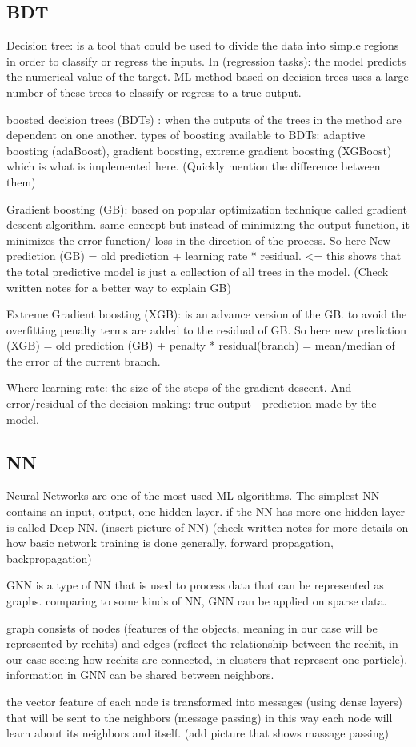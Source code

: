 \subsection{BDT}

Decision tree: is a tool that could be used to divide the data into simple regions in order to classify or regress the inputs. In (regression tasks): the model predicts the numerical value of the target. ML method based on decision trees uses a large number of these trees to classify or regress to a true output.

boosted decision trees (BDTs) : when the outputs of the trees in the method are dependent on one another.  types of boosting available to BDTs: adaptive boosting (adaBoost), gradient boosting, extreme gradient boosting (XGBoost) which is what is implemented here. (Quickly mention the difference between them)

Gradient boosting (GB): based on popular optimization technique called gradient descent algorithm. same concept but instead of minimizing the output function, it minimizes the error function/ loss in the direction of the process. So here New prediction (GB) = old prediction + learning rate * residual. <= this shows that the total predictive model is just a collection of all trees in the model. (Check written notes for a better way to explain GB)

Extreme Gradient boosting (XGB): is an advance version of the GB. to avoid the overfitting penalty terms are added to the residual of GB. So here new prediction (XGB) = old prediction (GB) + penalty * residual(branch) = mean/median of the error of the current branch.

Where learning rate: the size of the steps of the gradient descent. And error/residual of the decision making: true output - prediction made by the model. 


\subsection{NN} 

Neural Networks are one of the most used ML algorithms. The simplest NN contains an input, output, one hidden layer. if the NN has more one hidden layer is called Deep NN. (insert picture of NN) (check written notes for more details on how basic network training is done generally, forward propagation, backpropagation)  

GNN is a type of NN that is used to process data that can be represented as graphs. comparing to some kinds of NN, GNN can be applied on sparse data. 

graph consists of nodes (features of the objects, meaning in our case will be represented by rechits) and edges (reflect the relationship between the rechit, in our case seeing how rechits are connected, in clusters that represent one particle). information in GNN can be shared between neighbors. 

the vector feature of each node is transformed into messages (using dense layers) that will be sent to the neighbors (message passing) in this way each node will learn about its neighbors and itself. (add picture that shows massage passing)


